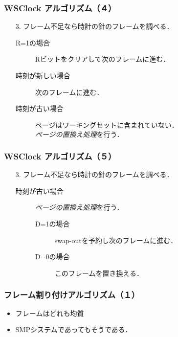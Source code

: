 \documentclass[unicode]{beamer}                   %
\begin{document}
\begin{frame}
  \frametitle{WSClock アルゴリズム（４）}


  \begin{enumerate}
  \item[3.] フレーム不足なら時計の針のフレームを調べる．
    \begin{description}
    \item[R=1の場合]
      Rビットをクリアして次のフレームに進む．
    \item[時刻が新しい場合]
      次のフレームに進む．
    \item[時刻が古い場合]
      ページはワーキングセットに含まれていない．\\
      \emph{ページの置換え処理}を行う．
    \end{description}
  \end{enumerate}
\end{frame}

\begin{frame}
  \frametitle{WSClock アルゴリズム（５）}


  \begin{enumerate}
  \item[3.] フレーム不足なら時計の針のフレームを調べる．
    \begin{description}
    \item[時刻が古い場合] \emph{ページの置換え処理}を行う．
      \begin{description}
      \item[D=1の場合]
        swap-outを予約し次のフレームに進む．
      \item[D=0の場合]
        このフレームを置き換える．
      \end{description}
    \end{description}
  \end{enumerate}
\end{frame}

\begin{frame}
  \frametitle{フレーム割り付けアルゴリズム（１）}
  \begin{itemize}
  \item フレームはどれも均質
  \item SMPシステムであってもそうである．
  \end{itemize}
\end{frame}
\end{document}
